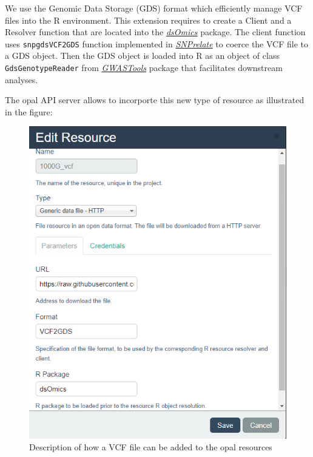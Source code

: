 \documentclass[]{article}
\begin{document}
We use the Genomic Data Storage (GDS) format which efficiently manage
VCF files into the R environment. This extension requires to create a
Client and a Resolver function that are located into the
\emph{\href{https://bioconductor.org/packages/3.9/dsOmics}{dsOmics}}
package. The client function uses \texttt{snpgdsVCF2GDS} function
implemented in
\emph{\href{https://bioconductor.org/packages/3.9/SNPrelate}{SNPrelate}}
to coerce the VCF file to a GDS object. Then the GDS object is loaded
into R as an object of class \texttt{GdsGenotypeReader} from
\emph{\href{https://bioconductor.org/packages/3.9/GWASTools}{GWASTools}}
package that facilitates downstream analyses.

The opal API server allows to incorporte this new type of resource as
illustrated in the figure:

\begin{figure}

{\centering \includegraphics[width=1\linewidth]{fig/opal_resource_VCF} 

}

\caption{Description of how a VCF file can be added to the opal resources}\label{fig:resourceVCF}
\end{figure}
\end{document}
